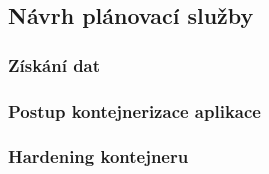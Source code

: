 \documentclass[thesis=M,czech]{FITthesis}[2019/12/23]
\theoremstyle{plain}
\theoremstyle{definition}
\begin{document}
\subsection{Návrh plánovací služby}



\subsubsection{Získání dat}



\subsubsection{Postup kontejnerizace aplikace}



\subsubsection{Hardening kontejneru}
\end{document}
